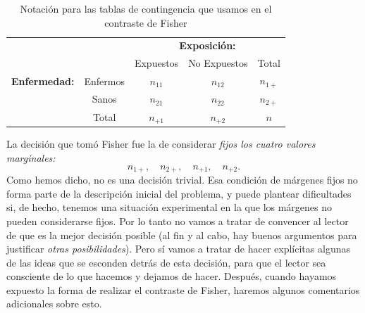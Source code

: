 \begin{table}[ht]
        \begin{center}
        \begin{tabular}{cc|c|c|c|}
              &\multicolumn{1}{c}{}&\multicolumn{3}{c}{\bf Exposición:}\\
              \cline{3-5}
               &\multicolumn{1}{c|}{}& Expuestos&  No Expuestos& Total \\
               \cline{2-5}
        {\bf Enfermedad:}&\multicolumn{1}{|c|}{Enfermos}& $n_{11}$ & $n_{12}$ & $n_{1+}$ \\ %
              \cline{2-5}
             & \multicolumn{1}{|c|}{Sanos }& $n_{21}$ & $n_{22}$ &  $n_{2+}$\\ %
              \cline{2-5}
             & \multicolumn{1}{|c|}{Total} & $n_{+1}$ & $n_{+2}$ & $n$ \\
              \cline{2-5}
        \end{tabular}
        \end{center}
\caption{Notación para las tablas de contingencia que usamos en el contraste de Fisher}
\label{cap12:tabla:notacionTablaContingenciaTestFisher}
\end{table}

La decisión que tomó Fisher fue la de considerar {\em fijos los cuatro valores marginales:}
\[n_{1+},\quad n_{2+},\quad n_{+1},\quad n_{+2}.\]
Como hemos dicho, no es una decisión trivial. Esa condición de márgenes fijos no forma parte de la descripción inicial del problema, y puede plantear dificultades si, de hecho, tenemos una situación experimental en la que los márgenes no pueden considerarse fijos. Por lo tanto no vamos a tratar de convencer al lector de que es la mejor decisión posible (al fin y al cabo, hay buenos argumentos para justificar {\em otras posibilidades}). Pero sí vamos a tratar de hacer explícitas algunas de las ideas que se esconden detrás de esta decisión, para que el lector  sea consciente de lo que hacemos y dejamos de hacer. Después, cuando hayamos expuesto la forma de realizar el contraste de Fisher, haremos algunos comentarios adicionales sobre esto.


